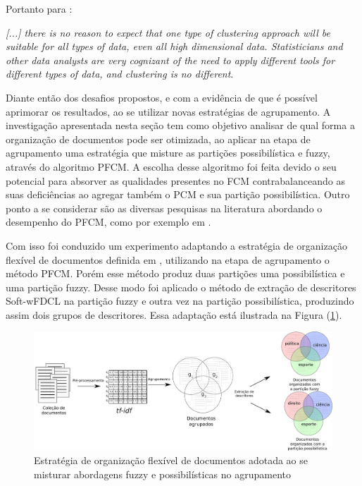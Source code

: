 Portanto para :
\begin{citacao}
  {\it [...] there is no reason to expect that one type of clustering approach will
  be suitable for all types of data, even all high dimensional data. Statisticians and other
  data analysts are very cognizant of the need to apply different tools for different types of
  data, and clustering is no different\/}.
\end{citacao}

Diante então dos desafios propostos, e com a evidência de que é possível aprimorar os resultados, ao
se utilizar novas estratégias de agrupamento. A investigação apresentada nesta seção tem como
objetivo analisar de qual forma a organização de documentos pode ser otimizada, ao aplicar na etapa
de agrupamento uma estratégia que misture as partições possibilística e fuzzy, através do algoritmo
PFCM. A escolha desse algoritmo foi feita devido o seu potencial para absorver as qualidades
presentes no FCM contrabalanceando as suas deficiências ao agregar também o PCM e sua partição
possibilística. Outro ponto a se considerar são as diversas pesquisas na literatura abordando o
desempenho do PFCM, 
como por exemplo em .

Com isso foi conduzido um experimento adaptando a estratégia de organização flexível de documentos
definida em ,
utilizando na etapa de agrupamento o método PFCM. Porém esse método produz duas partições uma
possibilística e uma partição fuzzy. Desse modo foi aplicado o método de extração de descritores
Soft-wFDCL na partição fuzzy e outra vez na partição possibilística, produzindo assim dois grupos de
descritores. Essa adaptação está ilustrada na Figura (\ref{fig:flexibleorganization}).

\begin{figure}[!htp] 
  \centering
  \includegraphics[width=1.0\columnwidth]{assets/process_pfcm.pdf} 
  \caption{Estratégia de organização flexível de documentos adotada ao se misturar abordagens fuzzy
  e possibilísticas no agrupamento} 
  \label{fig:flexibleorganization} 
\end{figure}

